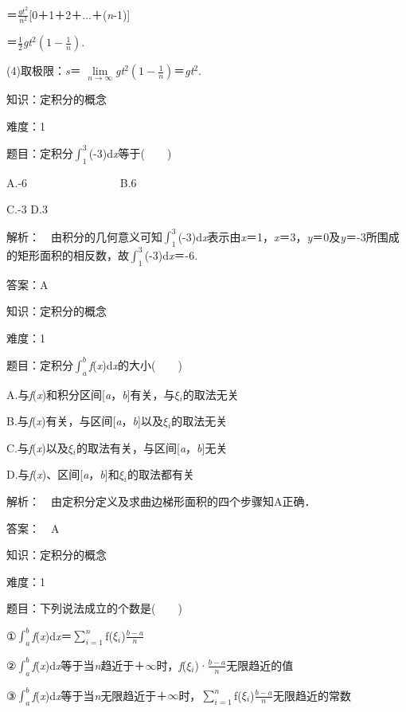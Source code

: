 \documentclass{article} %
\begin{document}
＝$\frac{gt^2}{n^2}$[0＋1＋2＋{$\dots$}＋(\textit{n}-1)]

＝$\frac{1}{2}$\textit{gt}${}^{2}(1-\frac{1}{n})$.

(4)取极限：\textit{s}＝ $\lim\limits_{n\rightarrow \infty}$\textit{gt}${}^{2}(1-\frac{1}{n})$＝\textit{gt}${}^{2}$.

 

 

 知识：定积分的概念

 难度：1

 题目：定积分$\int_{1}^{3}$(-3)d\textit{x}等于(　　)

A.-6　　　　　　　　  B.6

C.-3       D.3

 解析：　由积分的几何意义可知$\int_1^3$(-3)d\textit{x}表示由\textit{x}＝1，\textit{x}＝3，\textit{y}＝0及\textit{y}＝-3所围成的矩形面积的相反数，故$\int_1^3$(-3)d\textit{x}＝-6.

 答案：A

 

 知识：定积分的概念

 难度：1

 题目：定积分$\int_a^b$\textit{f}(\textit{x})d\textit{x}的大小(　　)

A.与\textit{f}(\textit{x})和积分区间[\textit{a}，\textit{b}]有关，与\textit{$\xi$${}_{i}$}的取法无关

B.与\textit{f}(\textit{x})有关，与区间[\textit{a}，\textit{b}]以及\textit{$\xi$${}_{i}$}的取法无关

C.与\textit{f}(\textit{x})以及\textit{$\xi$${}_{i}$}的取法有关，与区间[\textit{a}，\textit{b}]无关

D.与\textit{f}(\textit{x})、区间[\textit{a}，\textit{b}]和\textit{$\xi$${}_{i}$}的取法都有关

 解析：　由定积分定义及求曲边梯形面积的四个步骤知A正确．

 答案：　A



 知识：定积分的概念

 难度：1

 题目：下列说法成立的个数是(　　)

①$\int_a^b$\textit{f}(\textit{x})d\textit{x}＝$\sum\limits_{i=1}^n$f(\textit{$\xi$${}_{i}$})$\frac{b-a}{n}$

②$\int_a^b$\textit{f}(\textit{x})d\textit{x}等于当\textit{n}趋近于＋$\mathrm{\infty}$时，\textit{f}(\textit{$\xi$${}_{i}$})·$\frac{b-a}{n}$无限趋近的值

③$\int_a^b$\textit{f}(\textit{x})d\textit{x}等于当\textit{n}无限趋近于＋$\mathrm{\infty}$时，$\sum\limits_{i=1}^n$f(\textit{$\xi$${}_{i}$})$\frac{b-a}{n}$无限趋近的常数
\end{document}

